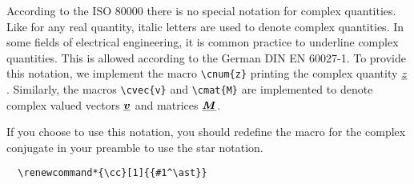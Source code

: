 \documentclass[DIV=13]{scrartcl}
\begin{document}
According to the ISO \num{80000} there is no special notation for complex
quantities. Like for any real quantity, italic letters are used to denote
complex quantities. In some fields of electrical engineering, it is common
practice to underline complex quantities. This is allowed according to the
German DIN EN \num{60027}-1. To provide this notation, we implement the
macro \verb|\cnum{z}| printing the complex quantity $\underline{\smash{z}}$. Similarly,
the macros \verb|\cvec{v}| and \verb|\cmat{M}| are implemented to denote
complex valued vectors $\underline{\smash{{\bm{v}}}}$ and matrices $\underline{\smash{{\bm{M}}}}$.

If you choose to use this notation, you should redefine the macro for the
complex conjugate in your preamble to use the star notation.
\begin{verbatim}
  \renewcommand*{\cc}[1]{{#1^\ast}}
\end{verbatim}
\end{document}

